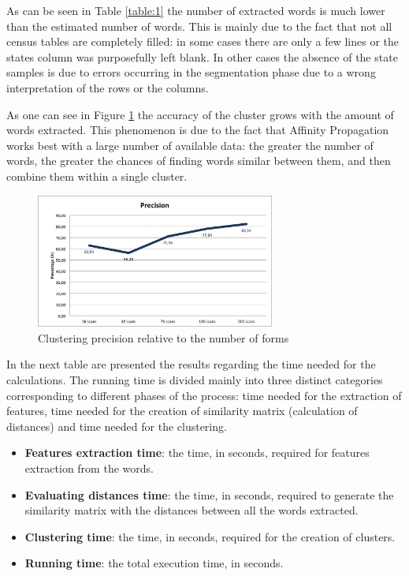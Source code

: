 As can be seen in Table \ref{table:1} the number of extracted words is much lower than the estimated number of words. This is mainly due to the fact that not all census tables are completely filled: in some cases there are only a few lines or the states column was purposefully left blank. In other cases the absence of the state samples is due to errors occurring in the segmentation phase due to a wrong interpretation of the rows or the columns.

As one can see in Figure \ref{fig:precision} the accuracy of the cluster grows with the amount of words extracted. This phenomenon is due to the fact that Affinity Propagation works best with a large number of available data: the greater the number of words, the greater the chances of finding words similar between them, and then combine them within a single cluster.


\begin{figure}[H]
\centering
\includegraphics[width=0.7\textwidth]{images/precisione.png}
\caption{Clustering precision relative to the number of forms}
\label{fig:precision}
\end{figure}

In the next table are presented the results regarding the time needed for the calculations. The running time is divided mainly into three distinct categories corresponding to different phases of the process: time needed for the extraction of features, time needed for the creation of similarity matrix (calculation of distances) and time needed for the clustering.

\begin{itemize}
\item \textbf{Features extraction time}: the time, in seconds, required for features extraction from the words.
\item \textbf{Evaluating distances time}: the time, in seconds, required to generate the similarity matrix with the distances between all the words extracted.
\item \textbf{Clustering time}: the time, in seconds, required for the creation of clusters.
\item \textbf{Running time}: the total execution time, in seconds.
\end{itemize}

